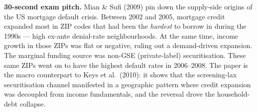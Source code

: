 \documentclass[11pt]{article}
\begin{document}
\begin{keybox}
\textbf{30-second exam pitch.} Mian \& Sufi (2009) pin down the supply-side origins of the US mortgage default crisis. Between 2002 and 2005, mortgage credit expanded most in ZIP codes that had been the \emph{hardest} to borrow in during the 1990s --- high ex-ante denial-rate neighbourhoods. At the same time, income growth in those ZIPs was flat or negative, ruling out a demand-driven expansion. The marginal funding source was non-GSE (private-label) securitisation. These same ZIPs went on to have the highest default rates in 2006--2008. The paper is the macro counterpart to Keys et al.\ (2010): it shows that the screening-lax securitisation channel manifested in a geographic pattern where credit expansion was decoupled from income fundamentals, and the reversal drove the household-debt collapse.
\end{keybox}
\end{document}
